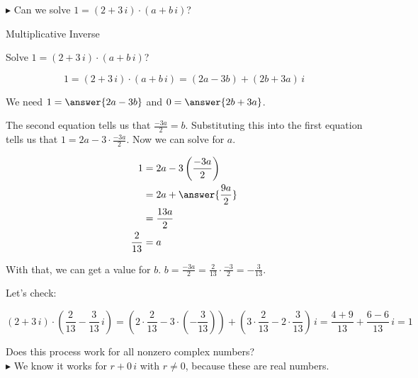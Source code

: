 \documentclass{ximera}
\begin{document}
 $\blacktriangleright$ Can we solve $1 = (2 + 3 \, i) \cdot (a + b \, i)  $?



\begin{example} Multiplicative Inverse


Solve $1 = (2 + 3 \, i) \cdot (a + b \, i)  $?


\begin{explanation}

\[   1 = (2 + 3 \, i) \cdot (a + b \, i)  =  (2a - 3b) + (2b+3a) \, i      \]






We need $1 = \answer{2a - 3b}$ and $0 = \answer{2b+3a}$.


The second  equation tells us that $\frac{-3a}{2} = b$.  Substituting this into the first equation tells us that $1 = 2a - 3 \cdot \frac{-3a}{2}$.  Now we can solve for $a$.



\begin{align*}
1     & = 2a - 3 \left( \frac{-3a}{2} \right)  \\
      & =   2a + \answer{\frac{9a}{2}}   \\
      & =    \frac{13a}{2}   \\
  \frac{2}{13}    & =  a
\end{align*}




With that, we can get a value for $b$.   $ b = \frac{-3a}{2} = \frac{2}{13}  \cdot \frac{-3}{2} = -\frac{3}{13}$.

Let's check:



\[    (2 + 3 \, i) \cdot \left(\frac{2}{13} - \frac{3}{13} \, i \right)     =   \left( 2 \cdot  \frac{2}{13} - 3 \cdot \left(- \frac{3}{13}\right)\right)  + \left( 3 \cdot \frac{2}{13} - 2 \cdot \frac{3}{13} \right) \, i = \frac{4+9}{13} + \frac{6-6}{13} \, i = 1  \]



\end{explanation}



\end{example}


Does this process work for all nonzero complex numbers? \\


$\blacktriangleright$  We know it works for $r + 0 \, i$ with $r \ne 0$, because these are real numbers.
\end{document}
